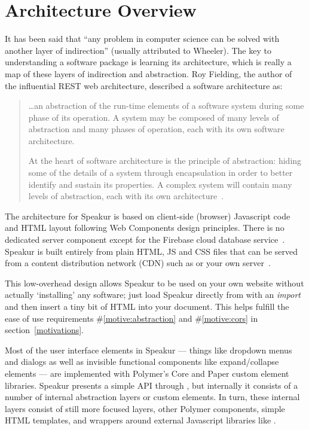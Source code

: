 \section{Architecture Overview}
It has been said that ``any problem in computer science can be solved with another layer of indirection'' (usually attributed to Wheeler).
The key to understanding a software package is learning its architecture,
which is really a map of these layers of indirection and abstraction.
Roy Fielding, the author of the influential REST web architecture, described a software architecture as:

\begin{quote}
\dots an abstraction of the run-time elements of a software system during some phase of its operation. A system may be composed of many levels of abstraction and many phases of operation, each with its own software architecture.

At the heart of software architecture is the principle of abstraction: hiding some of the details of a system through encapsulation in order to better identify and sustain its properties. A complex system will contain many levels of abstraction, each with its own architecture~\cite{fielding2000}.
\end{quote}

The architecture for Speakur is based on client-side (browser) Javascript code and HTML layout following Web Components design principles. 
There is no dedicated server component except for the Firebase cloud database service~\cite{firebasecontributors2015}.
Speakur is built entirely from plain HTML, JS and CSS files that can be served from a content distribution network (CDN) 
such as  or your own server~\cite{landers2015-d}.

This low-overhead design allows Speakur to be used on your own website without actually `installing' any software;
just load Speakur directly from  with an \textit{import}~\cite{landers2015-d}
and then insert a tiny bit of HTML into your document.
This helps fulfill the ease of use requirements 
\#\ref{motive:abstraction} and \#\ref{motive:cors}
in section~\ref{motivations}.

Most of the user interface elements in Speakur --- things like dropdown menus and dialogs as well as invisible functional components like expand/collapse elements  --- are implemented with Polymer's Core and Paper custom element libraries.
Speakur presents a simple API through ,
but internally it consists of a number of internal abstraction layers or custom elements.
In turn, these internal layers consist of still more focused layers, other Polymer components, simple HTML templates, and wrappers around external Javascript libraries like  .


